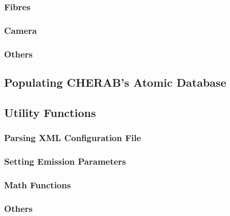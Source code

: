 \documentclass[../main.tex]{subfiles}
\begin{document}
\subsubsection{Fibres}
\subsubsection{Camera}
\subsubsection{Others}

\subsection{Populating CHERAB's Atomic Database}%
\label{sec:atomic}

\subsection{Utility Functions}%
\label{sec:utility}

\subsubsection{Parsing XML Configuration File}%
\label{sec:xml}

\subsubsection{Setting Emission Parameters}%
\label{sec:emission}

\subsubsection{Math Functions}%
\label{sec:math}

\subsubsection{Others}%
\label{sec:other}
\end{document}
